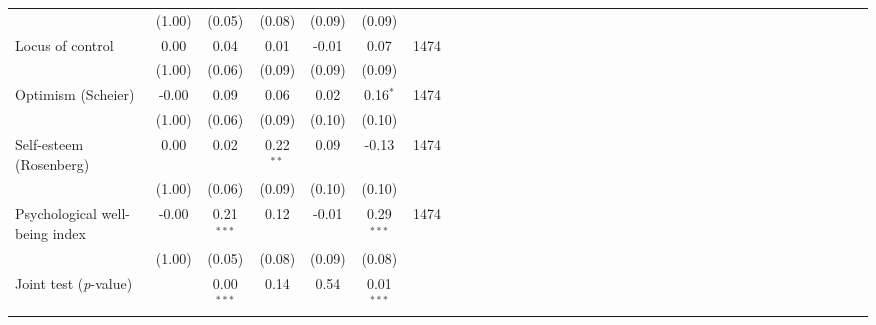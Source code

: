 {\begin{tabular}{l*{6}{SSSSSc}}
          &   (1.00)&   (0.05)&   (0.08)&   (0.09)&   (0.09)&         \\
Locus of control&     0.00&     0.04&     0.01&    -0.01&     0.07&     1474\\
          &   (1.00)&   (0.06)&   (0.09)&   (0.09)&   (0.09)&         \\
Optimism (Scheier)&    -0.00&     0.09&     0.06&     0.02&0.16$^{*}$&     1474\\
          &   (1.00)&   (0.06)&   (0.09)&   (0.10)&   (0.10)&         \\
Self-esteem (Rosenberg)&     0.00&     0.02&0.22$^{**}$&     0.09&    -0.13&     1474\\
          &   (1.00)&   (0.06)&   (0.09)&   (0.10)&   (0.10)&         \\
Psychological well-being index&    -0.00&0.21$^{***}$&     0.12&    -0.01&0.29$^{***}$&     1474\\
          &   (1.00)&   (0.05)&   (0.08)&   (0.09)&   (0.08)&         \\
\midrule Joint test (\emph{p}-value)&         &0.00$^{***}$&     0.14&     0.54&0.01$^{***}$&         \\
\bottomrule
\end{tabular}
}
